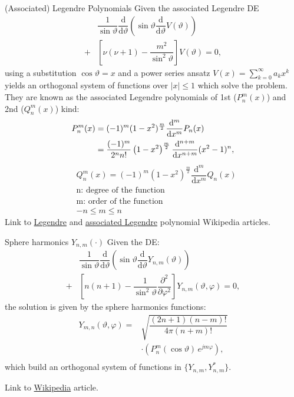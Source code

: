 \begin{info}{(Associated) Legendre Polynomials}
  Given the associated Legendre DE
  \begin{align*}
    &\dfrac{1}{\sin\vartheta}\dfrac{\mathrm{d}}{\mathrm{d}\vartheta}
    \left(\sin\vartheta \dfrac{\mathrm{d}}{\mathrm{d}\vartheta}V(\vartheta)\right)\\
    + &\left[\nu(\nu+1) - \dfrac{m^{2}}{\sin^{2}\vartheta}\right] V(\vartheta) = 0,
  \end{align*}
  using a substitution $\cos\vartheta = x$ and a power series ansatz $V(x) = \sum\limits_{k=0}^{\infty}a_{k}x^{k}$ yields an orthogonal system of functions over $|x|\leq 1$ which solve the problem.\\
  They are known as the associated Legendre polynomials of 1st ($P_{n}^{m}(x)$) and 2nd ($Q_{n}^{m}(x)$) kind:
  \begin{align*}
    P_{n}^{m}(x) &= (-1)^{m}(1-x^{2})^{\frac{m}{2}} \dfrac{\mathrm{d}^{m}}{\mathrm{d}x^{m}} P_{n}(x)\\
    &= \dfrac{(-1)^{m}}{2^{n}n!} \left(1 - x^{2}\right)^{\frac{m}{2}}\dfrac{\mathrm{d}^{n+m}}{\mathrm{d}x^{n+m}}(x^{2}-1)^{n},
  \end{align*}
  \begin{align*}
    &Q_{n}^{m}(x) = (-1)^{m}(1-x^{2})^{\frac{m}{2}} \dfrac{\mathrm{d}^{m}}{\mathrm{d}x^{m}} Q_{n}(x)\\
    &\text{n: degree of the function}\\
    &\text{m: order of the function}\\
    &-n \leq m \leq n
  \end{align*}
  Link to \href{https://en.wikipedia.org/wiki/Legendre_polynomials}{Legendre} and \href{https://en.wikipedia.org/wiki/Associated_Legendre_polynomials}{associated Legendre} polynomial Wikipedia articles.
\end{info}
\begin{recipe}{Sphere harmonics $Y_{n,m}(\cdot)$}
  Given the DE:
  \begin{align*}
    &\dfrac{1}{\sin\vartheta}\dfrac{\mathrm{d}}{\mathrm{d}\vartheta}
    \left(\sin\vartheta \dfrac{\mathrm{d}}{\mathrm{d}\vartheta}Y_{n,m}(\vartheta)\right)\\
    + &\left[n(n+1) - \dfrac{1}{\sin^{2}\vartheta}\dfrac{\partial^{2}}{\partial\varphi^{2}}\right] Y_{n,m}(\vartheta, \varphi) = 0,
  \end{align*}
  the solution is given by the sphere harmonics functions:
  \begin{align*}
    Y_{m,n}(\vartheta,\varphi) = &\sqrt{\dfrac{(2n+1)(n-m)!}{4\pi(n+m)!}}\\
                           &\cdot (P_{n}^{m}(\cos\vartheta)\,e^{jm\varphi}),\\
  \end{align*}
  which build an orthogonal system of functions in $\{Y_{n,m}, Y_{n,m}^{*}\}$.

  Link to \href{https://en.wikipedia.org/wiki/Spherical_harmonics}{Wikipedia} article.
\end{recipe}


